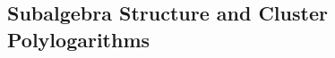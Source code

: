\documentclass[11pt]{article}
\def\x{\mathcal{X}}
\def\draftnote#1{{\bf [#1]}}
\begin{document}
\subsection{Subalgebra Structure and Cluster Polylogarithms}

\end{document}
